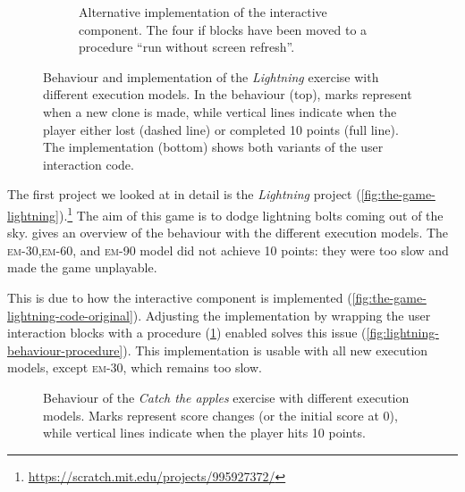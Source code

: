 \documentclass[../main]{subfiles}
\begin{document}
\begin{figure}
\begin{subfigure}{0.49\linewidth}
\begin{scratch}[scale=0.5]
        \end{scratch}
        \caption{
            Alternative implementation of the interactive component.
            The four if blocks have been moved to a procedure ``run without screen refresh''.
        }
        \label{fig:the-game-lightning-code-better}
    \end{subfigure}
    \caption{
        Behaviour and implementation of the \textit{Lightning} exercise with different execution models.
        In the behaviour (top), marks represent when a new clone is made, while vertical lines indicate when the player either lost (dashed line) or completed 10 points (full line).
        The implementation (bottom) shows both variants of the user interaction code.
    }
    \label{fig:lightning-behaviour}
\end{figure}

The first project we looked at in detail is the \textit{Lightning} project (\cref{fig:the-game-lightning}).\footnote{\url{https://scratch.mit.edu/projects/995927372/}}
The aim of this game is to dodge lightning bolts coming out of the sky.
 gives an overview of the behaviour with the different execution models.
The \textsc{em-30},\textsc{em-60}, and \textsc{em-90} model did not achieve 10 points: they were too slow and made the game unplayable.

This is due to how the interactive component is implemented (\cref{fig:the-game-lightning-code-original}).
Adjusting the implementation by wrapping the user interaction blocks with a procedure (\cref{fig:the-game-lightning-code-better}) enabled solves this issue (\cref{fig:lightning-behaviour-procedure}).
This implementation is usable with all new execution models, except \textsc{em-30}, which remains too slow.


\begin{figure}
    \centering
    
    \caption{
        Behaviour of the \textit{Catch the apples} exercise with different execution models.
        Marks represent score changes (or the initial score at 0), while vertical lines indicate when the player hits 10 points.
    }
    \label{fig:catch-apples-behaviour}
\end{figure}
\end{document}
